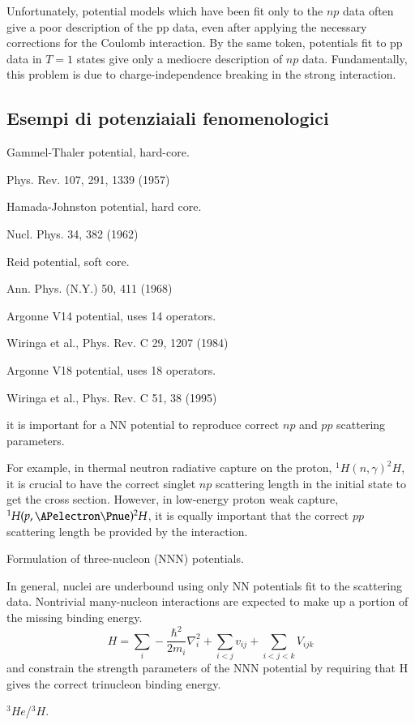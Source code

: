 \documentclass[main.tex]{subfiles}
\begin{document}
Unfortunately,	potential models which have been fit only to the $np$ data often give a poor description of the pp data, even after applying the necessary corrections for the Coulomb interaction. By the same token, potentials fit to pp data in $T=1$ states give only a mediocre description of $np$ data. Fundamentally, this problem is due to charge-independence breaking in the strong interaction.


\subsection{Esempi di potenziaiali fenomenologici}

\begin{itemize*}
\item Gammel-Thaler potential, hard-core.

Phys. Rev. 107, 291, 1339 (1957)
\item Hamada-Johnston potential, hard core.

Nucl. Phys. 34, 382 (1962)
\item Reid potential, soft core.

Ann. Phys. (N.Y.) 50, 411 (1968)
\item Argonne V14 potential, uses 14 operators.

Wiringa et al., Phys. Rev. C 29, 1207 (1984)
\item Argonne V18 potential, uses 18 operators.

Wiringa et al., Phys. Rev. C 51, 38 (1995)
\end{itemize*}

\begin{itemize*}
\item it is important for a NN potential to reproduce correct $np$ and $pp$ scattering parameters.

For example, in thermal neutron radiative capture on the proton, $^1H(n,\gamma)^2H$, it is crucial to have the correct singlet $np$ scattering length in the initial state to  get the cross section. However, in low-energy proton weak capture, $^1H(p,\APelectron\Pnue)^2H$, it is equally important that the correct $pp$ scattering length be provided by the interaction.

\item Formulation of three-nucleon (NNN) potentials.

In general, nuclei are underbound using only NN potentials fit to the scattering data. Nontrivial many-nucleon interactions are expected to make up a portion of the missing binding energy.
\begin{equation*}
H=\sum_i-\frac{\hbar^2}{2m_i}\nabla_i^2+\sum_{i<j}v_{ij}+\sum_{i<j<k}V_{ijk}
\end{equation*}
and constrain the strength parameters of the NNN potential by requiring that H gives the correct trinucleon binding energy.

\item $^3He$/$^3H$.

\end{itemize*}
\end{document}

